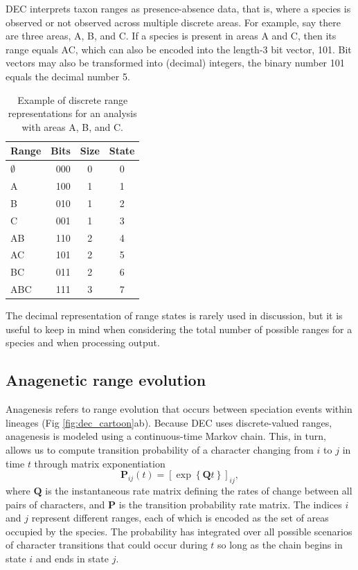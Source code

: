 DEC interprets taxon ranges as presence-absence data, that is, where a species is observed or not observed across multiple discrete areas.
For example, say there are three areas, A, B, and C.
If a species is present in areas A and C, then its range equals AC, which can also be encoded into the length-3 bit vector, 101.
Bit vectors may also be transformed into (decimal) integers, \EG the binary number 101 equals the decimal number 5.

\begin{table}[!ht]
\scriptsize
\centering
\begin{tabular}{lrcc}
Range & Bits & Size & State \\ \hline
$\emptyset$ & 000 & 0 & 0 \\
          A & 100 & 1 & 1 \\
          B & 010 & 1 & 2 \\
          C & 001 & 1 & 3 \\
         AB & 110 & 2 & 4 \\
         AC & 101 & 2 & 5 \\
         BC & 011 & 2 & 6 \\
        ABC & 111 & 3 & 7 \\
\end{tabular}
\caption{Example of discrete range representations for an analysis with areas A, B, and C.}
\end{table}

The decimal representation of range states is rarely used in discussion, but it is useful to keep in mind when considering the total number of possible ranges for a species and when processing output.

\subsection*{Anagenetic range evolution}


Anagenesis refers to range evolution that occurs between speciation events within lineages (Fig \ref{fig:dec_cartoon}ab).
Because DEC uses discrete-valued ranges, anagenesis is modeled using a continuous-time Markov chain.
This, in turn, allows us to compute transition probability of a character changing from $i$ to $j$ in time $t$ through matrix exponentiation
\[
\mathbf{P}_{ij}(t) = \left[ \exp \left\lbrace \mathbf{Q}t \right\rbrace \right]_{ij},
\]
where $\textbf{Q}$ is the instantaneous rate matrix defining the rates of change between all pairs of characters, and $\textbf{P}$ is the transition probability rate matrix.
The indices $i$ and $j$ represent different ranges, each of which is encoded as the set of areas occupied by the species.
The probability has integrated over all possible scenarios of character transitions that could occur during $t$ so long as the chain begins in state $i$ and ends in state $j$.

